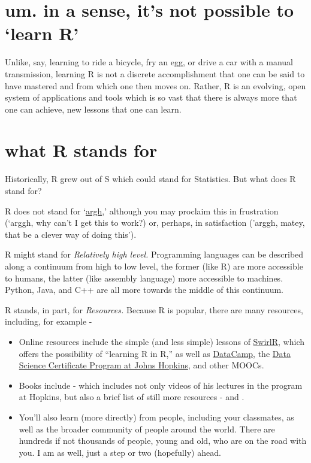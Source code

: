\documentclass[openany]{book}
\providecommand{\tightlist}{%
  \setlength{\itemsep}{0pt}\setlength{\parskip}{0pt}}
\begin{document}
\hypertarget{um.-in-a-sense-its-not-possible-to-learn-r}{%
\section{um. in a sense, it's not possible to `learn R'}\label{um.-in-a-sense-its-not-possible-to-learn-r}}

Unlike, say, learning to ride a bicycle, fry an egg, or drive a car with a manual transmission, learning R is not a discrete accomplishment that one can be said to have mastered and from which one then moves on. Rather, R is an evolving, open system of applications and tools which is so vast that there is always more that one can achieve, new lessons that one can learn.

\hypertarget{what-r-stands-for}{%
\section{what R stands for}\label{what-r-stands-for}}

Historically, R grew out of S which could stand for Statistics. But what does R stand for?

R does not stand for `\href{https://www.urbandictionary.com/define.php?term=ARGH}{argh},' although you may proclaim this in frustration (`arggh, why can't I get this to work?) or, perhaps, in satisfaction ('arggh, matey, that be a clever way of doing this').

R might stand for \emph{Relatively high level.} Programming languages can be described along a continuum from high to low level, the former (like R) are more accessible to humans, the latter (like assembly language) more accessible to machines. Python, Java, and C++ are all more towards the middle of this continuum.

R stands, in part, for \emph{Resources.} Because R is popular, there are many resources, including, for example -

\begin{itemize}
\tightlist
\item
  Online resources include the simple (and less simple) lessons of \href{http://swirlstats.com/}{SwirlR}, which offers the possibility of ``learning R in R,'' as well as \href{https://www.datacamp.com/home}{DataCamp}, the \href{https://www.coursera.org/specializations/jhu-data-science}{Data Science Certificate Program at Johns Hopkins,} and other MOOCs.\\
\item
  Books include \citet{peng2015r} - which includes not only videos of his lectures in the program at Hopkins, but also a brief list of still more resources - and \citet{wickham2016r}.
\item
  You'll also learn (more directly) from people, including your classmates, as well as the broader community of people around the world. There are hundreds if not thousands of people, young and old, who are on the road with you. I am as well, just a step or two (hopefully) ahead.
\end{itemize}
\end{document}
